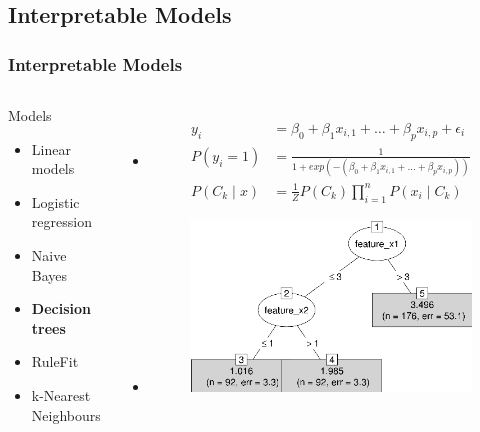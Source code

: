 \documentclass{beamer}\usepackage[]{graphicx}\usepackage[]{color}
\begin{document}
\subsection{Interpretable Models} %
\begin{frame}[fragile]
\frametitle{Interpretable Models}
\begin{columns}[c] %
\begin{block}{Models}
\begin{itemize}
\item Linear models 
\item Logistic regression 
\item Naive Bayes
\item \textbf{Decision trees} 
\item RuleFit\footnotemark[3]
\item k-Nearest Neighbours
\end{itemize}
\end{block}
\tiny
\begin{itemize}
\item[] \begin{equation*}\begin{aligned} y_i &= \beta_0 + \beta_1 x_{i,1} + \ldots + \beta_p x_{i,p} + \epsilon_i \\
P(y_i = 1) &= \frac{1}{1+exp(-(\beta_0+\beta_1 x_{i,1} + \ldots + \beta_p x_{i,p}))} \\
P(C_k \mid x) &= \frac{1}{Z} P(C_k) \prod_{i=1}^n P(x_i \mid C_k)\end{aligned}\end{equation*}
\item[] 
\begin{figure}
	\includegraphics[width=0.5\linewidth]{tree_example.png}
\end{figure}

\end{itemize}
\end{columns}
\end{frame}
\end{document}
